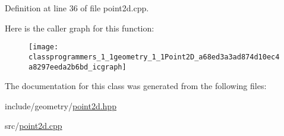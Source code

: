 Definition at line 36 of file point2d.\+cpp.

Here is the caller graph for this function\+:\nopagebreak
\begin{figure}[H]
\begin{center}
\leavevmode
\texttt{[image: classprogrammers\_1\_1geometry\_1\_1Point2D\_a68ed3a3ad874d10ec4a8297eeda2b6bd\_icgraph]}
\end{center}
\end{figure}


The documentation for this class was generated from the following files\+:\begin{DoxyCompactItemize}
\item 
include/geometry/\hyperlink{point2d_8hpp}{point2d.\+hpp}\item 
src/\hyperlink{src_2point2d_8cpp}{point2d.\+cpp}\end{DoxyCompactItemize}
